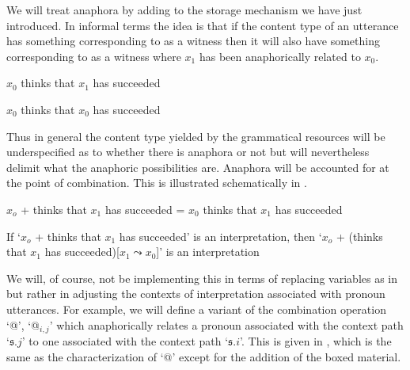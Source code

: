 We will treat anaphora by adding to the storage mechanism we have just
introduced.  In informal terms the idea is that if the content type of
an utterance has something corresponding to  as a witness
then it will also have something corresponding to  as a
witness where $x_1$ has been anaphorically related to $x_0$.
\begin{ex} 
\begin{subex} 
 
\item $x_0$ thinks that $x_1$ has succeeded 
 
\item $x_0$ thinks that $x_0$ has succeeded 
 
\end{subex} 
   
\end{ex} 
Thus in general the content type yielded by the grammatical resources
will be underspecified as to whether there is anaphora or not but will
nevertheless delimit what the anaphoric possibilities are.  Anaphora
will be accounted for at the point of combination.  This is
illustrated schematically in \nexteg{}.
\begin{ex} 
\begin{subex} 
 
\item $x_o$ + thinks that $x_1$ has succeeded = $x_0$ thinks that
  $x_1$ has succeeded 
 
\item If `$x_o$ + thinks that $x_1$ has succeeded' is an
  interpretation, then `$x_o$ + (thinks that $x_1$ has
  succeeded)[$x_1\leadsto x_0$]' is an interpretation
 
\end{subex} 
   
\end{ex} 
We will, of course, not be implementing this in terms of replacing
variables as in \preveg{} but rather in adjusting the contexts of
interpretation associated with pronoun utterances.  For example, we
will define a variant of the combination operation `@', `@$_{i,j}$' which
anaphorically relates a pronoun associated with the context path
`$\mathfrak{s}.j$' to one associated with the context path
`$\mathfrak{s}.i$'.  This is given in \nexteg{}, which is the same as
the characterization of `@' except for the addition of the boxed material.
